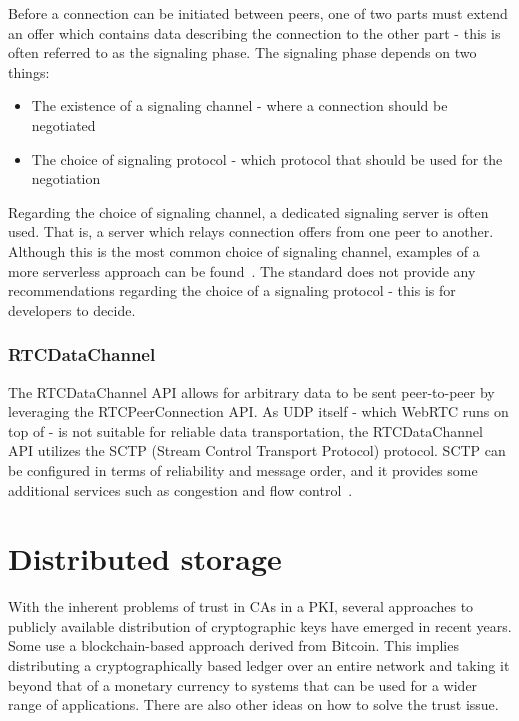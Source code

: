 
Before a connection can be initiated between peers, one of two parts must extend an offer which contains data describing the connection to the other part - this is often referred to as the signaling phase. The signaling phase depends on two things:

\begin{itemize}
  \item The existence of a signaling channel - where a connection should be negotiated
  \item The choice of signaling protocol - which protocol that should be used for the negotiation
\end{itemize}

Regarding the choice of signaling channel, a dedicated signaling server is often used. That is, a server which relays connection offers from one peer to another. Although this is the most common choice of signaling channel, examples of a more serverless approach can be found~\cite{webrtcsignalserver}. The standard does not provide any recommendations regarding the choice of a signaling protocol - this is for developers to decide.

\subsubsection{RTCDataChannel}
The RTCDataChannel API allows for arbitrary data to be sent peer-to-peer by leveraging the RTCPeerConnection API. As UDP itself - which WebRTC runs on top of - is not suitable for reliable data transportation, the RTCDataChannel API utilizes the SCTP (Stream Control Transport Protocol) protocol. SCTP can be configured in terms of reliability and message order, and it provides some additional services such as congestion and flow control~\cite{HighPerfBrowserNetworking:Online}.

\section{Distributed storage}
\label{sec:distributedstorage}
With the inherent problems of trust in CAs in a PKI, several approaches to publicly available distribution of cryptographic keys have emerged in recent years. Some use a blockchain-based approach derived from Bitcoin. This implies distributing a cryptographically based ledger over an entire network and taking it beyond that of a monetary currency to systems that can be used for a wider range of applications. There are also other ideas on how to solve the trust issue.

